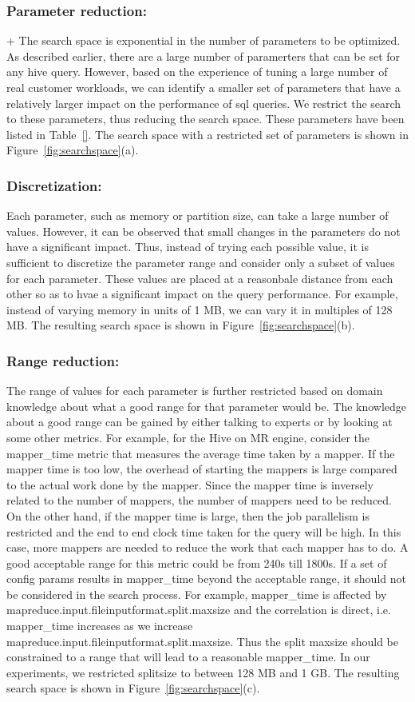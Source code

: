 \noindent\subsubsection*{\bf Parameter reduction: }
+\label{sec:paramreduction}
The search space is exponential in the number of parameters to be optimized. As described earlier, there are a large number of paramerters that can be set for any hive query. However, based on the experience of tuning a large number of real customer workloads, we can identify a smaller set of parameters that have a relatively larger impact on the performance of sql queries. We restrict the search to these parameters, thus reducing the search space. These parameters have been listed in Table~\ref{}. The search space with a restricted set of parameters is shown in Figure~\ref{fig:searchspace}(a).
\noindent\subsubsection*{\bf Discretization: }
Each parameter, such as memory or partition size, can take a large number of values. However, it can be observed that small changes in the parameters do not have a significant impact. Thus, instead of trying each possible value, it is sufficient to discretize the parameter range and consider only a subset of values for each parameter. These values are placed at a reasonbale distance from each other so as to hvae a significant impact on the query performance. For example, instead of varying memory in units of 1 MB, we can vary it in multiples of 128 MB. The resulting search space is shown in Figure~\ref{fig:searchspace}(b).
\noindent\subsubsection*{\bf Range reduction: }
The range of values for each parameter is further restricted based on domain knowledge about what a good range for that parameter would be.  The knowledge about a good range can be gained by either talking to experts or by looking at some other metrics. For example, for the Hive on MR engine, consider the mapper\_time metric that measures the average time taken by a mapper. If the mapper time is too low, the overhead of starting the mappers is large compared to the actual work done by the mapper. Since the mapper time is inversely related to the number of mappers, the number of mappers need to be reduced. On the other hand, if the mapper time is large, then the job parallelism is restricted and the end to end clock time taken for the query will be high. In this case, more mappers are needed to reduce the work that each mapper has to do. A good acceptable range for this metric could be from 240s till 1800s.  If a set of config params results in mapper\_time beyond the acceptable range, it should not be considered in the search process. For example, mapper\_time is affected by mapreduce.input.fileinputformat.split.maxsize and the correlation is direct, i.e. mapper\_time  increases as we increase mapreduce.input.fileinputformat.split.maxsize.  Thus the split maxsize should be constrained to a range that will lead to a reasonable mapper\_time. In our experiments, we restricted splitsize to between 128 MB and 1 GB. The resulting search space is shown in Figure~\ref{fig:searchspace}(c).
